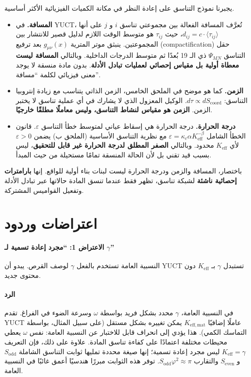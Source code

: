 \documentclass[12pt,a4paper]{article}
\newcommand{\Sodd}{S_{\mathrm{odd}}}
\newcommand{\Seven}{S_{\mathrm{even}}}
\begin{document}
	يجبرنا نموذج التناسق على إعادة النظر في مكانة الكميات الفيزيائية الأكثر أساسية.
	
	\begin{itemize}
		\item \textbf{المسافة.} في YUCT، تُعرَّف المسافة الفعالة بين مجموعتي تناسق \(i\) و \(j\) على أنها \(d_{ij} = c \cdot \langle \tau_{ij} \rangle\)، حيث \(\tau_{ij}\) هو متوسط الوقت اللازم لدليل قصير للانتشار بين المجموعتين. ينبثق موتر المترية \(g_{\mu\nu}(x)\) بعد ترفيع (compactification) حقل التناسق \(\Psi_{MN}\) ذي الـ 19 بُعدًا ثم متوسط الدرجات الداخلية. وبالتالي \textbf{المسافة ليست معطاة أولية بل مقياس إحصائي لعمليات تبادل الأدلة}. بدون مادة منسقة لا يوجد معنى فيزيائي لكلمة ``مسافة''.
		
		\item \textbf{الزمن.} كما هو موضح في الملحق الخامس، الزمن الذاتي يتناسب مع زيادة إنتروبيا التناسق: \(d\tau \propto dS_{\mathrm{coord}}\). الوكيل المعزول الذي لا يشارك في أي عملية تناسق لا يختبر الزمن. \textbf{الزمن هو مقياس لنشاط التناسق، وليس معاملًا مطلقًا خارجيًا}.
		
		\item \textbf{درجة الحرارة.} درجة الحرارة هي إسقاط عياني لمتوسط خطأ التناسق \(\varepsilon\). قانون الخطأ الشامل \(\varepsilon = \kappa_c \alpha K_{\mathrm{eff}}^{-\beta}\) مع نظرية التناسق الأساسية (الملحق ب) يضمن \(\varepsilon > 0\) لأي \(K_{\mathrm{eff}}\) محدود. وبالتالي \textbf{الصفر المطلق لدرجة الحرارة غير قابل للتحقيق}، ليس بسبب قيد تقني بل لأن الحالة المنسقة تمامًا مستحيلة من حيث المبدأ.
	\end{itemize}
	
	باختصار، المسافة والزمن ودرجة الحرارة ليست لبنات بناء أولية للواقع. إنها \textbf{بارامترات إحصائية ناشئة} لشبكة تناسق، تظهر فقط عندما تنسق المادة حالاتها عبر تبادل الأدلة وتفعيل القواميس المشتركة.
	
	\section{اعتراضات وردود}
	\label{sec:objections}
	
	\paragraph{الاعتراض 1: ``مجرد إعادة تسمية لـ \(\gamma\)''}
	النسبية العامة تستخدم بالفعل \(\gamma\) لوصف القرص. يبدو أن YUCT تستبدل \(\gamma\) بـ \(K_{\mathrm{eff}}\) دون محتوى جديد.
	
	\paragraph{الرد}
	في النسبية العامة، \(\gamma\) محدد بشكل فريد بواسطة \(\omega\) وسرعة الضوء في الفراغ. تقدم YUCT عاملًا إضافيًا \(K_{\mathrm{eff,mat}}\) يمكن تغييره بشكل مستقل (على سبيل المثال، بواسطة التماسك الكمي). هذا يؤدي إلى انحراف قابل للاختبار عن النسبية العامة: نفس \(\omega\) يعطي محيطات مختلفة اعتمادًا على كفاءة تناسق المادة. علاوة على ذلك، فإن التعريف \(K_{\mathrm{eff}} = \gamma\) ليس مجرد إعادة تسمية؛ إنها صيغة محددة تمليها ثوابت التناسق الشاملة \(\Sodd\) و \(\Seven\) والتقارب \(\Sodd \varphi^2 \approx \pi\). توفر هذه الثوابت مبررًا هندسيًا أعمق غائبًا في النسبية العامة.
	
\end{document}
